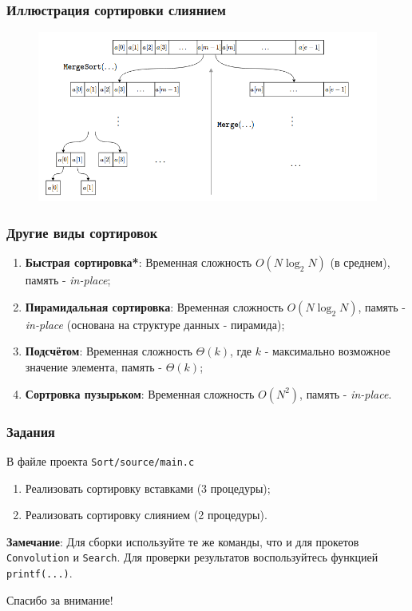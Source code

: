 \documentclass{beamer}
\begin{document}
    \begin{frame}
        \frametitle{Иллюстрация сортировки слиянием}
        \begin{figure}[!tbp]
           \centering
           \includegraphics[width=\textwidth]{pics/sort.png}
       \end{figure}
    \end{frame}
    \begin{frame}
        \frametitle{Другие виды сортировок}
        \begin{enumerate}
            \justifying
            \item {\bf Быстрая сортировка*}: Временная сложность $O(N\log_{2}{N})$ (в среднем), память - {\it in-place};
            \item {\bf Пирамидальная сортировка}: Временная сложность $O(N\log_{2}{N})$, память - {\it in-place} (основана на структуре данных - пирамида);
            \item {\bf Подсчётом}:  Временная сложность $\Theta(k)$, где $k$ - максимально возможное значение элемента, память -  $\Theta(k)$;
            \item {\bf Сортровка пузырьком}:  Временная сложность $O(N^{2})$,  память - {\it in-place}.
        \end{enumerate}
    \end{frame}
    \begin{frame}[fragile]
        \frametitle{Задания}
        \justifying
        В файле проекта {\tt Sort/source/main.c}
        \begin{enumerate}
            \item Реализовать сортировку вставками (3 процедуры);
            \item Реализовать сортировку слиянием (2 процедуры).
        \end{enumerate}
        \vspace{1cm}
        \par
        \justifying
        {\bf Замечание}: Для сборки используйте те же команды, что и для прокетов {\tt Convolution} и {\tt Search}. Для проверки результатов воспользуйтесь функцией {\tt printf(...)}.
    \end{frame}
    \begin{frame}
        \begin{center}
        \baselineskip 20.0mm
        \Huge Спасибо за внимание!
        \end{center}
    \end{frame}
\end{document}

